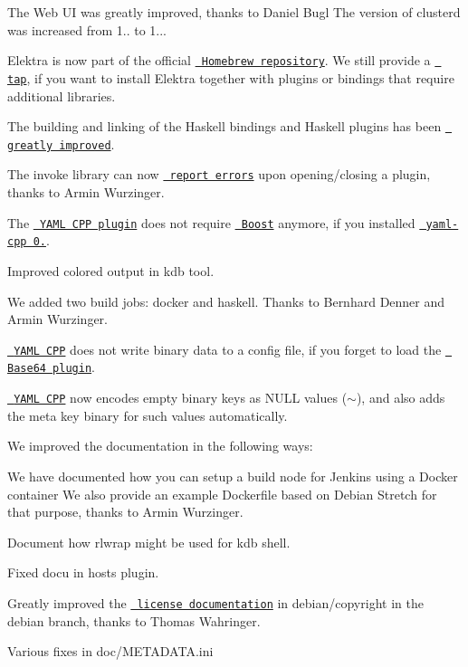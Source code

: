 \begin{DoxyItemize}
\item The Web UI was greatly improved, thanks to Daniel Bugl The version of clusterd was increased from 1.. to 1...
\item Elektra is now part of the official \href{http://formulae.brew.sh/formula/elektra}{\texttt{ Homebrew repository}}. We still provide a \href{http://github.com/ElektraInitiative/homebrew-elektra}{\texttt{ tap}}, if you want to install Elektra together with plugins or bindings that require additional libraries.
\item The building and linking of the Haskell bindings and Haskell plugins has been \href{https://github.com/ElektraInitiative/libelektra/pull/1698}{\texttt{ greatly improved}}.
\item The invoke library can now \href{https://github.com/ElektraInitiative/libelektra/pull/1801}{\texttt{ report errors}} upon opening/closing a plugin, thanks to Armin Wurzinger.
\item The \href{https://www.libelektra.org/plugins/yamlcpp}{\texttt{ Y\+A\+ML C\+PP plugin}} does not require \href{http://www.boost.org}{\texttt{ Boost}} anymore, if you installed \href{https://github.com/jbeder/yaml-cpp/releases/tag/yaml-cpp-0.6.0}{\texttt{ yaml-\/cpp 0.}}.
\item Improved colored output in {\ttfamily kdb} tool.
\item We added two build jobs\+: docker and haskell. Thanks to Bernhard Denner and Armin Wurzinger.
\item \href{https://www.libelektra.org/plugins/yamlcpp}{\texttt{ Y\+A\+ML C\+PP}} does not write binary data to a config file, if you forget to load the \href{https://www.libelektra.org/plugins/base64}{\texttt{ Base64 plugin}}.
\item \href{https://www.libelektra.org/plugins/yamlcpp}{\texttt{ Y\+A\+ML C\+PP}} now encodes empty binary keys as N\+U\+LL values ({\ttfamily $\sim$}), and also adds the meta key {\ttfamily binary} for such values automatically.
\end{DoxyItemize}

We improved the documentation in the following ways\+:


\begin{DoxyItemize}
\item We have documented how you can setup a build node for Jenkins using a Docker container We also provide an example Dockerfile based on Debian Stretch for that purpose, thanks to Armin Wurzinger.
\item Document how {\ttfamily rlwrap} might be used for {\ttfamily kdb shell}.
\item Fixed docu in {\ttfamily hosts} plugin.
\item Greatly improved the \href{https://git.libelektra.org/blob/debian/debian/copyright}{\texttt{ license documentation}} in {\ttfamily debian/copyright} in the {\ttfamily debian} branch, thanks to Thomas Wahringer.
\item Various fixes in doc/\+M\+E\+T\+A\+D\+A\+T\+A.\+ini
\end{DoxyItemize}

